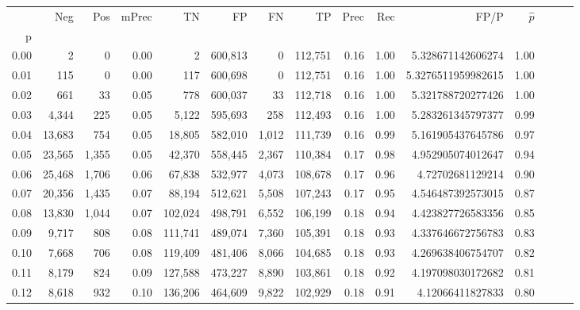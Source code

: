 \begin{tabular}{rrrrrrrrrrrrrrr}
\toprule
{} &     Neg &    Pos & mPrec &       TN &       FP &       FN &       TP &  Prec &   Rec &                    FP/P & $\hat{p}$ \\
p    &         &        &       &          &          &          &          &       &       &                         &           \\
\midrule
0.00 &       2 &      0 &  0.00 &        2 &  600,813 &        0 &  112,751 &  0.16 &  1.00 &       5.328671142606274 &      1.00 \\
0.01 &     115 &      0 &  0.00 &      117 &  600,698 &        0 &  112,751 &  0.16 &  1.00 &      5.3276511959982615 &      1.00 \\
0.02 &     661 &     33 &  0.05 &      778 &  600,037 &       33 &  112,718 &  0.16 &  1.00 &       5.321788720277426 &      1.00 \\
0.03 &   4,344 &    225 &  0.05 &    5,122 &  595,693 &      258 &  112,493 &  0.16 &  1.00 &       5.283261345797377 &      0.99 \\
0.04 &  13,683 &    754 &  0.05 &   18,805 &  582,010 &    1,012 &  111,739 &  0.16 &  0.99 &       5.161905437645786 &      0.97 \\
0.05 &  23,565 &  1,355 &  0.05 &   42,370 &  558,445 &    2,367 &  110,384 &  0.17 &  0.98 &       4.952905074012647 &      0.94 \\
0.06 &  25,468 &  1,706 &  0.06 &   67,838 &  532,977 &    4,073 &  108,678 &  0.17 &  0.96 &        4.72702681129214 &      0.90 \\
0.07 &  20,356 &  1,435 &  0.07 &   88,194 &  512,621 &    5,508 &  107,243 &  0.17 &  0.95 &       4.546487392573015 &      0.87 \\
0.08 &  13,830 &  1,044 &  0.07 &  102,024 &  498,791 &    6,552 &  106,199 &  0.18 &  0.94 &       4.423827726583356 &      0.85 \\
0.09 &   9,717 &    808 &  0.08 &  111,741 &  489,074 &    7,360 &  105,391 &  0.18 &  0.93 &       4.337646672756783 &      0.83 \\
0.10 &   7,668 &    706 &  0.08 &  119,409 &  481,406 &    8,066 &  104,685 &  0.18 &  0.93 &       4.269638406754707 &      0.82 \\
0.11 &   8,179 &    824 &  0.09 &  127,588 &  473,227 &    8,890 &  103,861 &  0.18 &  0.92 &       4.197098030172682 &      0.81 \\
0.12 &   8,618 &    932 &  0.10 &  136,206 &  464,609 &    9,822 &  102,929 &  0.18 &  0.91 &        4.12066411827833 &      0.80 \\

\end{tabular}
